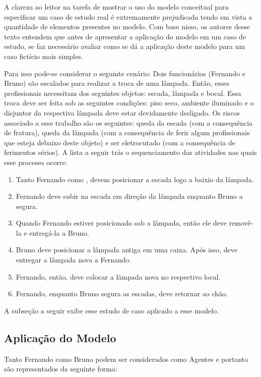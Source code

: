 A clareza ao leitor na tarefa de mostrar o uso do modelo conceitual para especificar um caso de estudo real é extremamente prejudicada tendo em vista a quantidade de elementos presentes no modelo. Com base nisso, os autores desse texto entendem que antes de apresentar a aplicação do modelo em um caso de estudo, se faz necessário avaliar como se dá a aplicação deste modelo para um caso fictício mais simples. 

Para isso pode-se considerar o seguinte cenário: Dois funcionários (Fernando e Bruno) são escalados para realizar a troca de uma lâmpada. Então, esses profissionais necessitam dos seguintes objetos: escada, lâmpada e bocal. Essa troca deve ser feita sob as seguintes condições: piso seco, ambiente iluminado e o disjuntor da respectiva lâmpada deve estar devidamente desligado. Os riscos associado a esse trabalho são os seguintes: queda da escada (com a consequência de fratura), queda da lâmpada (com a consequência de ferir algum profissionais que esteja debaixo deste objeto) e ser eletrocutado (com a consequência de ferimentos sérios). A lista a seguir trás o sequenciamento das atividades nas quais esse processo ocorre:

\begin{enumerate}
	\item Tanto Fernando como , devem posicionar a escada logo a baixio da lâmpada. 
	\item Fernando deve subir na escada em direção da lâmpada enquanto Bruno a segura. 
	\item Quando Fernando estiver posicionado sob a lâmpada, então ele deve removê-la e entregá-la a Bruno. 
	\item Bruno deve posicionar a lâmpada antiga em uma caixa. Após isso, deve entregar a lâmpada nova a Fernando.
	\item Fernando, então, deve colocar a lâmpada nova no respectivo local. 
	\item Fernando, enquanto Bruno segura as escadas, deve retornar ao chão. 
\end{enumerate}

A subseção a seguir exibe esse estudo de caso aplicado a esse modelo. 

\subsection{Aplicação do Modelo}

Tanto Fernando como Bruno podem ser considerados como Agentes e portanto são representados da seguinte forma:

